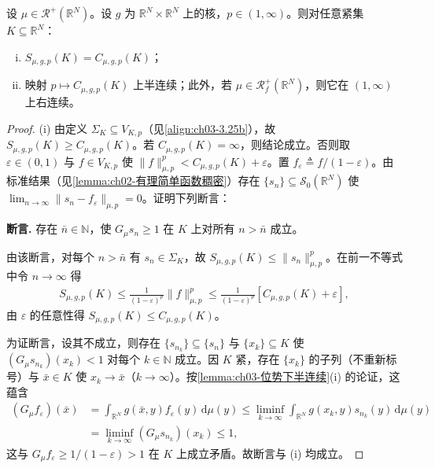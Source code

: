 \documentclass[../../main.tex]{subfiles}%
\begin{document}
\begin{proposition}\label{proposition:ch03-简单函数逼近}
设 $\mu\in\mathscr{R}^+(\mathbb{R}^N)$。设 $g$ 为 $\mathbb{R}^N\times\mathbb{R}^N$ 上的核，$p\in(1,\infty)$。则对任意紧集 $K\subseteq\mathbb{R}^N$：
\begin{enumerate}[(i)]
\item $S_{\mu,g,p}(K)=C_{\mu,g,p}(K)$；
\item 映射 $p\mapsto C_{\mu,g,p}(K)$ 上半连续；此外，若 $\mu\in\mathscr{R}^+_f(\mathbb{R}^N)$，则它在 $(1,\infty)$ 上右连续。
\end{enumerate}
\end{proposition}

\begin{proof}
(i) 由定义 $\Sigma_K\subseteq V_{K,p}$（见\eqref{align:ch03-3.25b}），故 $S_{\mu,g,p}(K)\geqslant C_{\mu,g,p}(K)$。若 $C_{\mu,g,p}(K)=\infty$，则结论成立。否则取 $\varepsilon\in(0,1)$ 与 $f\in V_{K,p}$ 使 $\|f\|_{\mu,p}^p<C_{\mu,g,p}(K)+\varepsilon$。置 $f_\varepsilon\triangleq f/(1-\varepsilon)$。由标准结果（见\cref{lemma:ch02-有理简单函数稠密}）存在 $\{s_n\}\subseteq\mathscr S_0(\mathbb{R}^N)$ 使 $\lim_{n\to\infty}\|s_n-f_\varepsilon\|_{\mu,p}=0$。证明下列断言：

\textbf{断言.} 存在 $\bar n\in\mathbb{N}$，使 $G_\mu s_n\geqslant1$ 在 $K$ 上对所有 $n>\bar n$ 成立。

由该断言，对每个 $n>\bar n$ 有 $s_n\in\Sigma_K$，故 $S_{\mu,g,p}(K)\leqslant\|s_n\|_{\mu,p}^p$。在前一不等式中令 $n\to\infty$ 得
\begin{align*}
S_{\mu,g,p}(K)\leqslant\frac{1}{(1-\varepsilon)^p}\|f\|_{\mu,p}^p\leqslant\frac{1}{(1-\varepsilon)^p}\left[C_{\mu,g,p}(K)+\varepsilon\right],
\end{align*}
由 $\varepsilon$ 的任意性得 $S_{\mu,g,p}(K)\leqslant C_{\mu,g,p}(K)$。

为证断言，设其不成立，则存在 $\{s_{n_k}\}\subseteq\{s_n\}$ 与 $\{x_k\}\subseteq K$ 使 $(G_\mu s_{n_k})(x_k)<1$ 对每个 $k\in\mathbb{N}$ 成立。因 $K$ 紧，存在 $\{x_k\}$ 的子列（不重新标号）与 $\bar x\in K$ 使 $x_k\to\bar x$（$k\to\infty$）。按\cref{lemma:ch03-位势下半连续}(i) 的论证，这蕴含
\begin{align*}
(G_\mu f_\varepsilon)(\bar x)&=\int_{\mathbb{R}^N}g(\bar x,y)f_\varepsilon(y)\,\mathrm{d}\mu(y)\leqslant\liminf_{k\to\infty}\int_{\mathbb{R}^N}g(x_k,y)s_{n_k}(y)\,\mathrm{d}\mu(y)\\
&=\liminf_{k\to\infty}(G_\mu s_{n_k})(x_k)\leqslant1,
\end{align*}
这与 $G_\mu f_\varepsilon\geqslant1/(1-\varepsilon)>1$ 在 $K$ 上成立矛盾。故断言与 (i) 均成立。


\end{proof}
\end{document}
